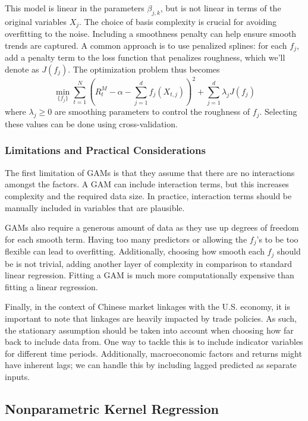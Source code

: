This model is linear in the parameters $\beta_{j,k}$, but is not linear in terms of the original variables $X_j$. The choice of basis complexity is crucial for avoiding overfitting to the noise. Including a smoothness penalty can help ensure smooth trends are captured. A common approach is to use penalized splines: for each $f_j$, add a penalty term to the loss function that penalizes roughness, which we'll denote as $J(f_j)$. The optimization problem thus becomes $$\min_{\{f_j\}}\sum_{t=1}^N\left(R_t^M-\alpha-\sum_{j=1}^df_j(X_{t, j})\right)^2+\sum_{j=1}^d\lambda_jJ(f_j)$$ where $\lambda_j \ge 0$ are smoothing parameters to control the roughness of $f_j$. Selecting these values can be done using cross-validation.

\subsubsection{Limitations and Practical Considerations}

The first limitation of GAMs is that they assume that there are no interactions amongst the factors. A GAM can include interaction terms, but this increases complexity and the required data size. In practice, interaction terms should be manually included in variables that are plausible.

GAMs also require a generous amount of data as they use up degrees of freedom for each smooth term. Having too many predictors or allowing the $f_j$'s to be too flexible can lead to overfitting. Additionally, choosing how smooth each $f_j$ should be is not trivial, adding another layer of complexity in comparison to standard linear regression. Fitting a GAM is much more computationally expensive than fitting a linear regression. 

Finally, in the context of Chinese market linkages with the U.S. economy, it is important to note that linkages are heavily impacted by trade policies. As such, the stationary assumption should be taken into account when choosing how far back to include data from. One way to tackle this is to include indicator variables for different time periods. Additionally, macroeconomic factors and returns might have inherent lags; we can handle this by including lagged predicted as separate inputs.

\subsection{Nonparametric Kernel Regression}

